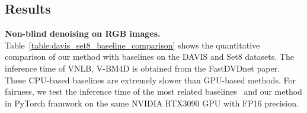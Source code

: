 \documentclass[sigconf]{acmart}
\begin{document}
\begin{table*}[t]
\centering
\caption{Quantitative comparisons of PSNR for blind denoising. 
}
\renewcommand{\arraystretch}{0.9}
\label{table:davis_set8_baseline_comparison_blind_denoising}
\end{table*}






\subsection{Results}





\textbf{Non-blind denoising on RGB images. }
Table~\ref{table:davis_set8_baseline_comparison} shows the quantitative comparison of our method with baselines on the DAVIS and Set8 datasets. 
The inference time of VNLB, V-BM4D is obtained from the FastDVDnet paper. 
These CPU-based baselines are extremely slower than GPU-based methods. 
For fairness, we test the inference time of the most related baselines~\cite{Vaksman2021Patch,Tassano2020FastDVDNet,tassano2019dvdnet,Davy2018Non-Local} and our method in PyTorch framwork on the same NVIDIA RTX3090 GPU with FP16 precision.
\end{document}
